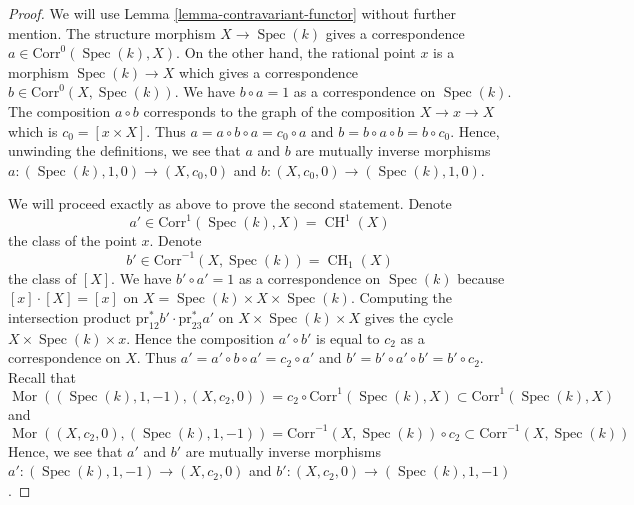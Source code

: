 \documentclass[10pt,a4paper]{amsart}
\theoremstyle{plain}
\theoremstyle{definition}
\theoremstyle{remark}
\numberwithin{equation}{subsection}
\def\Spec{\mathop{\mathrm{Spec}}}
\def\Mor{\mathop{\mathrm{Mor}}\nolimits}
\def\CH{\mathop{\mathrm{CH}}\nolimits}
\begin{document}
\begin{proof}
We will use Lemma \ref{lemma-contravariant-functor} without further mention.
The structure morphism $X \to \Spec(k)$ gives a correspondence
$a \in \text{Corr}^0(\Spec(k), X)$. On the other hand, the rational
point $x$ is a morphism $\Spec(k) \to X$ which gives a correspondence
$b \in \text{Corr}^0(X, \Spec(k))$. We have $b \circ a = 1$ as a
correspondence on $\Spec(k)$. The composition $a \circ b$ corresponds
to the graph of the composition $X \to x \to X$ which is
$c_0 = [x \times X]$. Thus $a = a \circ b \circ a = c_0 \circ a$
and $b = b \circ a \circ b = b \circ c_0$.
Hence, unwinding the definitions, we see that
$a$ and $b$ are mutually inverse morphisms
$a : (\Spec(k), 1, 0) \to (X, c_0, 0)$ and
$b : (X, c_0, 0) \to (\Spec(k), 1, 0)$.

\medskip\noindent
We will proceed exactly as above to prove the second statement.
Denote
$$
a' \in \text{Corr}^1(\Spec(k), X) = \CH^1(X)
$$
the class of the point $x$. Denote
$$
b' \in \text{Corr}^{-1}(X, \Spec(k)) = \CH_1(X)
$$
the class of $[X]$. We have $b' \circ a' = 1$ as a correspondence
on $\Spec(k)$ because $[x] \cdot [X] = [x]$ on
$X = \Spec(k) \times X \times \Spec(k)$. Computing the
intersection product $\text{pr}_{12}^*b' \cdot \text{pr}_{23}^*a'$
on $X \times \Spec(k) \times X$ gives the cycle
$X \times \Spec(k) \times x$. Hence
the composition $a' \circ b'$ is equal to $c_2$ as a
correspondence on $X$. Thus $a' = a' \circ b \circ a' = c_2 \circ a'$
and $b' = b' \circ a' \circ b' = b' \circ c_2$. Recall that
$$
\Mor((\Spec(k), 1, -1), (X, c_2, 0)) =
c_2 \circ \text{Corr}^1(\Spec(k), X)
\subset
\text{Corr}^1(\Spec(k), X)
$$
and
$$
\Mor((X, c_2, 0), (\Spec(k), 1, -1)) =
\text{Corr}^{-1}(X, \Spec(k)) \circ c_2
\subset
\text{Corr}^{-1}(X, \Spec(k))
$$
Hence, we see that $a'$ and $b'$ are mutually inverse morphisms
$a' : (\Spec(k), 1, -1) \to (X, c_2, 0)$ and
$b' : (X, c_2, 0) \to (\Spec(k), 1, -1)$.
\end{proof}
\end{document}
